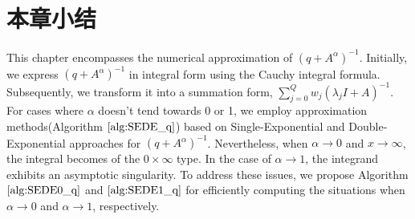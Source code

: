 \section{本章小结}

This chapter encompasses the numerical approximation of $(q+A^{\alpha})^{-1}$. Initially, we express $(q+A^{\alpha})^{-1}$ in integral form using the Cauchy integral formula. Subsequently, we transform it into a summation form, $\sum_{j=0}^{Q}w_j(\lambda_jI+A)^{-1}$. For cases where $\alpha$ doesn't tend towards 0 or 1, we employ approximation methods(Algorithm $\ref{alg:SEDE_q}$) based on Single-Exponential and Double-Exponential approaches for $(q+A^{\alpha})^{-1}$. Nevertheless, when $\alpha \rightarrow 0$ and $x \rightarrow \infty$, the integral becomes of the $0 \times \infty$ type.  In the case of $\alpha \rightarrow 1$, the integrand exhibits an asymptotic singularity. To address these issues, we propose Algorithm $\ref{alg:SEDE0_q}$ and $\ref{alg:SEDE1_q}$ for efficiently computing the situations when $\alpha \rightarrow 0$ and $\alpha \rightarrow 1$, respectively.